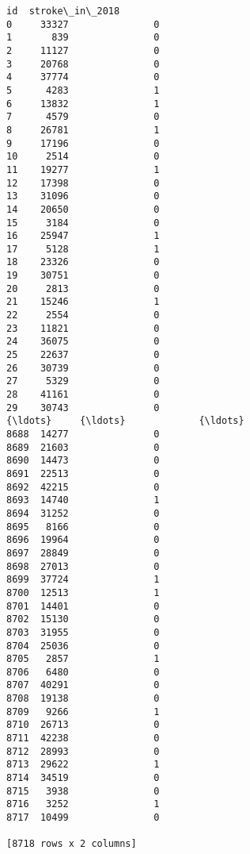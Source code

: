 \documentclass[11pt]{article}
\begin{document}
    \begin{Verbatim}[commandchars=\\\{\}]
         id  stroke\_in\_2018
0     33327               0
1       839               0
2     11127               0
3     20768               0
4     37774               0
5      4283               1
6     13832               1
7      4579               0
8     26781               1
9     17196               0
10     2514               0
11    19277               1
12    17398               0
13    31096               0
14    20650               0
15     3184               0
16    25947               1
17     5128               1
18    23326               0
19    30751               0
20     2813               0
21    15246               1
22     2554               0
23    11821               0
24    36075               0
25    22637               0
26    30739               0
27     5329               0
28    41161               0
29    30743               0
{\ldots}     {\ldots}             {\ldots}
8688  14277               0
8689  21603               0
8690  14473               0
8691  22513               0
8692  42215               0
8693  14740               1
8694  31252               0
8695   8166               0
8696  19964               0
8697  28849               0
8698  27013               0
8699  37724               1
8700  12513               1
8701  14401               0
8702  15130               0
8703  31955               0
8704  25036               0
8705   2857               1
8706   6480               0
8707  40291               0
8708  19138               0
8709   9266               1
8710  26713               0
8711  42238               0
8712  28993               0
8713  29622               1
8714  34519               0
8715   3938               0
8716   3252               1
8717  10499               0

[8718 rows x 2 columns]

    \end{Verbatim}


    
    
    
    
\end{document}
